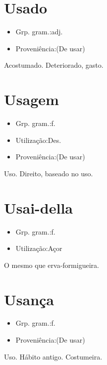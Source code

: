 \documentclass{article}
\begin{document}
\section{Usado}
\begin{itemize}
\item {Grp. gram.:adj.}
\end{itemize}
\begin{itemize}
\item {Proveniência:(De \textunderscore usar\textunderscore )}
\end{itemize}
Acostumado.
Deteriorado, gasto.
\section{Usagem}
\begin{itemize}
\item {Grp. gram.:f.}
\end{itemize}
\begin{itemize}
\item {Utilização:Des.}
\end{itemize}
\begin{itemize}
\item {Proveniência:(De \textunderscore usar\textunderscore )}
\end{itemize}
Uso.
Direito, baseado no uso.
\section{Usai-della}
\begin{itemize}
\item {Grp. gram.:f.}
\end{itemize}
\begin{itemize}
\item {Utilização:Açor}
\end{itemize}
O mesmo que \textunderscore erva-formigueira\textunderscore .
\section{Usança}
\begin{itemize}
\item {Grp. gram.:f.}
\end{itemize}
\begin{itemize}
\item {Proveniência:(De \textunderscore usar\textunderscore )}
\end{itemize}
Uso.
Hábito antigo.
Costumeira.
\end{document}
